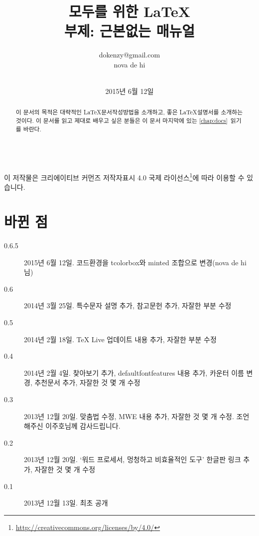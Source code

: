 \documentclass[oneside, chapter, 11pt]{oblivoir}
\title{모두를 위한 \LaTeX\\\small{부제: 근본없는 매뉴얼}}
\author{dokenzy@gmail.com\\nova de hi}
\date{\version판\\2015년 6월 12일}
\newcommand{\version}{0.6.5}
\begin{document}
\maketitle
\begin{abstract}
이 문서의 목적은 대략적인 \LaTeX 문서작성방법을 소개하고, 좋은 \LaTeX 설명서를 소개하는 것이다. 이 문서를 읽고  제대로 배우고 싶은 분들은 이 문서 마지막에 있는 \ref{chap:docs}\chaptername~\을 읽기를 바란다.
\end{abstract}

\begin{center}
\ccbyncsa\\
{\scriptsize 이 저작물은 크리에이티브 커먼즈 저작자표시 4.0 국제 라이선스\footnote{\href{http://creativecommons.org/licenses/by/4.0/}{http://creativecommons.org/licenses/by/4.0/}}에 따라 이용할 수 있습니다.}
\end{center}

\clearpage
\section*{바뀐 점}
\begin{description}
\item[\version] 2015년 6월 12일. 코드환경을 tcolorbox와 minted 조합으로 변경(nova de hi님)
\item[0.6] 2014년 3월 25일. 특수문자 설명 추가, 참고문헌 추가, 자잘한 부분 수정
\item[0.5] 2014년 2월 18일. TeX Live 업데이트 내용 추가, 자잘한 부분 수정
\item[0.4] 2014년 2월 4일. 찾아보기 추가, defaultfontfeatures 내용 추가, 카운터 이름 변경, 추천문서 추가, 자잘한 것 몇 개 수정
\item[0.3] 2013년 12월 20일. 맞춤법 수정, MWE 내용 추가, 자잘한 것 몇 개 수정. 조언해주신 이주호님께 감사드립니다.
\item[0.2] 2013년 12월 20일. `워드 프로세서, 멍청하고 비효율적인 도구' 한글판 링크 추가, 자잘한 것 몇 개 수정
\item[0.1] 2013년 12월 13일. 최초 공개
\end{description}
\clearpage

\tableofcontents




\end{document}
